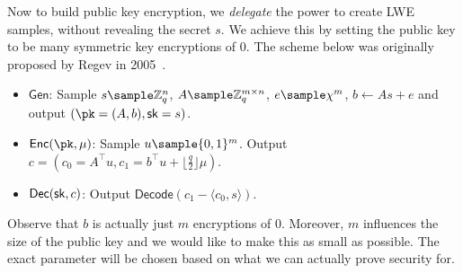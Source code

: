 \documentclass[12pt]{tufte-book}
\newcommand{\Gen}{\mathsf{Gen}}
\newcommand{\Enc}{\mathsf{Enc}}
\newcommand{\Dec}{\mathsf{Dec}}
\begin{document}
Now to build public key encryption, we \emph{delegate} the power to create LWE samples, without revealing the secret $s$. We achieve this by setting the public key to be many symmetric key encryptions of $0$. The scheme below was originally proposed by Regev in 2005~\cite{STOC:Regev05}.

\begin{itemize}
    \item $\Gen$: Sample $s \sample \mathbb{Z}_q^n$, $A \sample \mathbb{Z}_q^{m \times n}$, $e \sample \chi^m$, $b \gets As + e$ and output $(\pk = (A,b), \sk = s)$.
    \item $\Enc(\pk, \mu)$: Sample $u \sample \{0,1\}^m$. Output $c = (c_0 = A^\intercal u,c_1 =  b^\intercal u + \lfloor\frac{q}{2}\rfloor\mu)$.
    \item $\Dec(\sk, c)$: Output $\mathsf{Decode}(c_1 - \langle c_0, s\rangle)$.
\end{itemize}

Observe that $b$ is actually just $m$ encryptions of $0$. Moreover, $m$ influences the size of the public key and we would like to make this as small as possible. The exact parameter will be chosen based on what we can actually prove security for.
\end{document}
